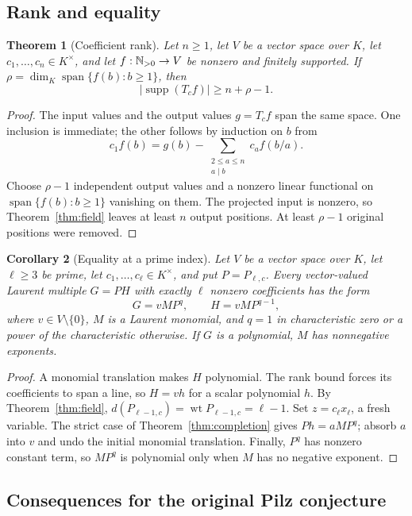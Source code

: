 \documentclass[11pt]{article}
\DeclareMathOperator{\wt}{wt}\DeclareMathOperator{\ord}{ord}
\DeclareMathOperator{\supp}{supp}\DeclareMathOperator{\rank}{rank}
\DeclareMathOperator{\Span}{span}\DeclareMathOperator{\dist}{\delta}
\numberwithin{equation}{section}
\newtheorem{theorem}{Theorem}[section]
\newtheorem{corollary}[theorem]{Corollary}
\theoremstyle{definition}\newtheorem{definition}[theorem]{Definition}
\theoremstyle{remark}\newtheorem{remark}[theorem]{Remark}
\begin{document}
\subsection{Rank and equality}

\begin{theorem}[Coefficient rank]\label{thm:coefficient-rank}
Let $n\ge1$, let $V$ be a vector space over $K$, let $c_1,\ldots,c_n\in K^\times$,
and let $f:\mathbb N_{>0}\to V$ be nonzero and finitely supported. If
$\rho=\dim_K\operatorname{span}\{f(b):b\ge1\}$, then
\[
 |\supp(T_cf)|\ge n+\rho-1.
\]
\end{theorem}
\begin{proof}
The input values and the output values $g=T_cf$ span the same space.
One inclusion is immediate; the other follows by induction on $b$ from
\[
 c_1f(b)=g(b)-
 \sum_{\substack{2\le a\le n\\a\mid b}}c_af(b/a).
\]
Choose $\rho-1$ independent output values and a nonzero linear
functional on $\Span\{f(b):b\ge1\}$ vanishing on them. The projected
input is nonzero, so Theorem~\ref{thm:field} leaves at least $n$
output positions. At least $\rho-1$ original positions were removed.
\end{proof}

\begin{corollary}[Equality at a prime index]\label{cor:prime-rigidity}
\label{cor:vector-prime-rigidity}
Let $V$ be a vector space over $K$, let $\ell\ge3$ be prime,
let $c_1,\ldots,c_\ell\in K^\times$, and put $P=P_{\ell,c}$.
Every vector-valued Laurent multiple
$G=PH$ with exactly $\ell$ nonzero coefficients has the form
\[
 G=vMP^q,\qquad H=vMP^{q-1},
\]
where $v\in V\setminus\{0\}$, $M$ is a Laurent monomial, and
$q=1$ in characteristic zero or a power of the characteristic
otherwise. If $G$ is a polynomial, $M$ has nonnegative exponents.
\end{corollary}
\begin{proof}
A monomial translation makes $H$ polynomial. The rank bound forces
its coefficients to span a line, so $H=vh$ for a scalar polynomial $h$.
By Theorem~\ref{thm:field},
$d(P_{\ell-1,c})=\wt P_{\ell-1,c}=\ell-1$.
Set $z=c_\ell x_\ell$, a fresh variable. The strict case of
Theorem~\ref{thm:completion} gives $Ph=aMP^q$; absorb $a$ into $v$
and undo the initial monomial translation.
Finally, $P^q$ has nonzero constant term, so $MP^q$ is polynomial
only when $M$ has no negative exponent.
\end{proof}

\subsection{Consequences for the original Pilz conjecture}
\end{document}
